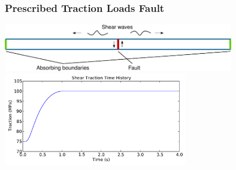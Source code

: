 \documentclass{beamer}
\begin{document}
\begin{frame}
  \frametitle{Prescribed Traction Loads Fault}

  \begin{center}
    \includegraphics[width=10.0cm]{figs/bar}\\ \vspace*{0.5cm}
    \includegraphics[width=8.0cm]{figs/bar_tractionth}
  \end{center}
  
\end{frame}


\end{document}
